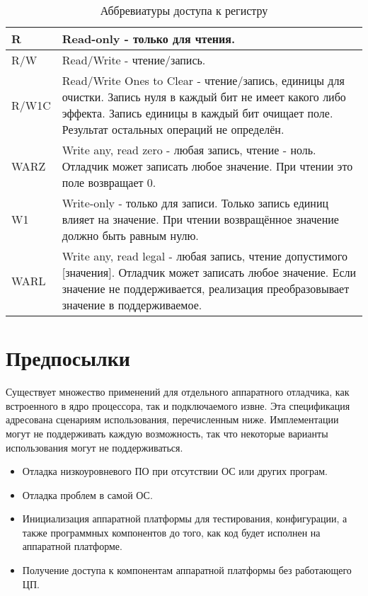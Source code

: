 \begin{table}[htp]
    \centering
    \caption{Аббревиатуры доступа к регистру}
    \label{tab:access}
    \begin{tabulary}{\textwidth}{|l|L|}
        \hline
        R & Read-only - только для чтения. \\
        \hline
        R/W & Read/Write - чтение/запись. \\
        \hline
        R/W1C & Read/Write Ones to Clear - чтение/запись, единицы для очистки.
        Запись нуля в каждый бит не имеет какого либо эффекта.
        Запись единицы в каждый бит очищает поле. Результат остальных операций
        не определён. \\
        \hline
        WARZ & Write any, read zero - любая запись, чтение - ноль.
        Отладчик может записать любое значение. При чтении
        это поле возвращает 0. \\
        \hline
        W1 & Write-only - только для записи.
        Только запись единиц влияет на значение. При чтении возвращённое
        значение должно быть равным нулю. \\
        \hline
        WARL & Write any, read legal - любая запись, чтение допустимого [значения].
        Отладчик может записать любое значение. Если значение
        не поддерживается, реализация преобразовывает значение в поддерживаемое. \\
        \hline
    \end{tabulary}
\end{table}

%

\section{Предпосылки}

Существует множество применений для отдельного аппаратного отладчика, как
встроенного в ядро процессора, так и подключаемого извне.
Эта спецификация адресована сценариям использования, перечисленным ниже. Имплементации
могут не поддерживать каждую возможность, так что некоторые варианты использования
могут не поддерживаться.

\begin{itemize}

\item Отладка низкоуровневого ПО при отсутствии ОС или других програм.

\item Отладка проблем в самой ОС.

\item Инициализация аппаратной платформы для тестирования, конфигурации, а также программных
  компонентов до того, как код будет исполнен на аппаратной платформе.

\item Получение доступа к компонентам аппаратной платформы без работающего ЦП.

\end{itemize}

